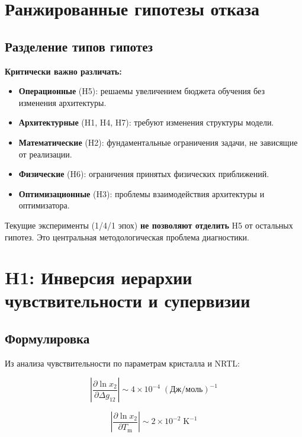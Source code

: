 \documentclass[11pt]{article}
\begin{document}
\section{Ранжированные гипотезы отказа}

\subsection{Разделение типов гипотез}

\textbf{Критически важно различать:}

\begin{itemize}
  \item \textbf{Операционные} (H5): решаемы увеличением бюджета обучения без изменения архитектуры.
  \item \textbf{Архитектурные} (H1, H4, H7): требуют изменения структуры модели.
  \item \textbf{Математические} (H2): фундаментальные ограничения задачи, не зависящие от реализации.
  \item \textbf{Физические} (H6): ограничения принятых физических приближений.
  \item \textbf{Оптимизационные} (H3): проблемы взаимодействия архитектуры и оптимизатора.
\end{itemize}

Текущие эксперименты (1/4/1 эпох) \textbf{не позволяют отделить} H5 от остальных гипотез. Это центральная методологическая проблема диагностики.

\section{H1: Инверсия иерархии чувствительности и супервизии}

\subsection{Формулировка}

Из анализа чувствительности по параметрам кристалла и NRTL:

\begin{equation*}
\left|\frac{\partial \ln x_2}{\partial \Delta g_{12}}\right| \sim 4 \times 10^{-4} \;(\text{Дж/моль})^{-1}
\end{equation*}

\begin{equation*}
\left|\frac{\partial \ln x_2}{\partial T_{\mathrm{m}}}\right| \sim 2 \times 10^{-2} \;\text{K}^{-1}
\end{equation*}
\end{document}
